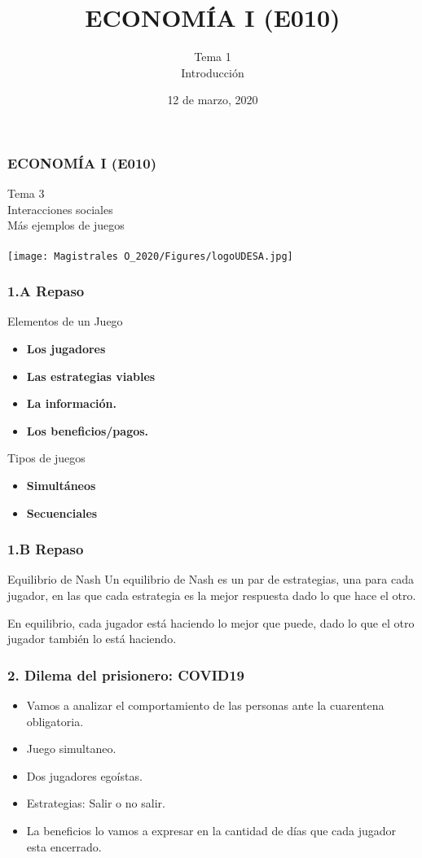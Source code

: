 \documentclass[14pt]{beamer}
\title{ECONOM\'{I}A I (E010)}
\subtitle{Tema 1 \\ Introducción}
\date{12 de marzo, 2020}
\begin{document}

\begin{frame}
\frametitle{ECONOM\'{I}A I (E010)}
\centering
Tema 3 \\ Interacciones sociales \\ \vspace{12mm} Más ejemplos de juegos \vspace{5mm} \\  \\ \texttt{[image: Magistrales O\_2020/Figures/logoUDESA.jpg]} 
\end{frame}

\begin{frame}
\frametitle{1.A Repaso}
\begin{block}{Elementos de un Juego}
\begin{itemize}
\item \textbf{Los jugadores} 
\item \textbf{Las estrategias viables} 
\item \textbf{La información.}
\item \textbf{Los beneficios/pagos.}
\end{itemize}
\end{block}
\vspace{5mm}
\begin{block}{Tipos de juegos}
\begin{itemize}
    \item \textbf{Simultáneos}
    \item \textbf{Secuenciales}
\end{itemize}
\end{block}
\end{frame}

\begin{frame}
\frametitle{1.B Repaso}
\begin{block}{Equilibrio de Nash}
Un equilibrio de Nash es un par de estrategias, una para cada jugador, en las que cada estrategia es la mejor respuesta dado lo que hace el otro.
\end{block}
\vspace{5mm}
En equilibrio, cada jugador está haciendo lo mejor que puede, dado lo que el otro jugador también lo está haciendo.
\end{frame}

\begin{frame}
\frametitle{2. Dilema del prisionero: COVID19}
\begin{itemize}
\item Vamos a analizar el comportamiento de las personas ante la cuarentena obligatoria.
\item Juego simultaneo.
\item Dos jugadores egoístas.
\item Estrategias: Salir o no salir.
\item La beneficios lo vamos a expresar en la cantidad de días que cada jugador esta encerrado.
\end{itemize}
\end{frame}
\end{document}
